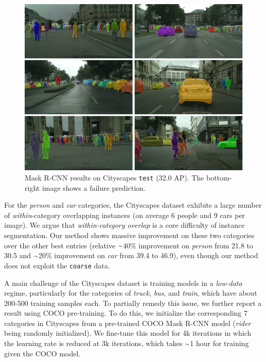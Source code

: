 \documentclass[10pt,twocolumn,letterpaper]{article}
\newcommand{\app}{\raise.17ex\hbox{$\scriptstyle\sim$}}
\begin{document}
\begin{figure}[t]
\centering
\includegraphics[width=1.0\linewidth]{ai/results_cityscapes}
\caption{Mask R-CNN results on Cityscapes \texttt{test} (32.0 AP). The bottom-right image shows a failure prediction.}
\label{fig:results_cityscapes}\vspace{-4mm}
\end{figure}

For the \emph{person} and \emph{car} categories, the Cityscapes dataset exhibits a large number of \emph{within}-category overlapping instances (on average 6 people and 9 cars per image). We argue that \emph{within-category overlap} is a core difficulty of instance segmentation. Our method shows massive improvement on these two categories over the other best entries (relative $\app$40\% improvement on \emph{person} from 21.8 to 30.5 and $\app$20\% improvement on \emph{car} from 39.4 to 46.9), even though our method does not exploit the \texttt{coarse} data.

A main challenge of the Cityscapes dataset is training models in a \emph{low-data} regime, particularly for the categories of \emph{truck}, \emph{bus}, and \emph{train}, which have about 200-500 training samples each. To partially remedy this issue, we further report a result using COCO pre-training. To do this, we initialize the corresponding 7 categories in Cityscapes from a pre-trained COCO Mask R-CNN model (\emph{rider} being randomly initialized). We fine-tune this model for 4k iterations in which the learning rate is reduced at 3k iterations, which takes $\app$1 hour for training given the COCO model.
\end{document}
